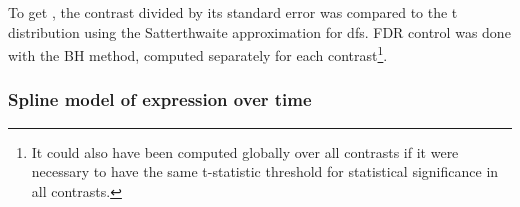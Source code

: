 %
% 
To get \pvalues, the contrast divided by its standard error was compared to the t distribution using the Satterthwaite approximation for \glspl{df}.
\Gls{FDR} control was done with the \gls{BH} method, computed separately for each contrast\footnote{
It could also have been computed globally over all contrasts if it were necessary to have the same t-statistic threshold for statistical significance in all contrasts.
}.


\subsubsection{Spline model of expression over time}


